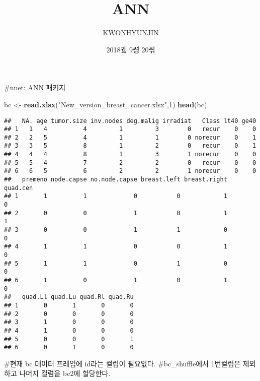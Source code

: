 \documentclass[]{article}
\title{ANN}
\author{KWONHYUNJIN}
\date{2018뀈 9썡 20씪}
\newenvironment{Shaded}{\begin{snugshade}}{\end{snugshade}}
\newcommand{\DecValTok}[1]{\textcolor[rgb]{0.00,0.00,0.81}{#1}}
\newcommand{\KeywordTok}[1]{\textcolor[rgb]{0.13,0.29,0.53}{\textbf{#1}}}
\newcommand{\NormalTok}[1]{#1}
\newcommand{\OperatorTok}[1]{\textcolor[rgb]{0.81,0.36,0.00}{\textbf{#1}}}
\newcommand{\StringTok}[1]{\textcolor[rgb]{0.31,0.60,0.02}{#1}}
\begin{document}
\maketitle

\#nnet: ANN 패키지

\begin{Shaded}
\begin{Highlighting}[]
\NormalTok{bc <-}\StringTok{ }\KeywordTok{read.xlsx}\NormalTok{(}\StringTok{"New_version_breast_cancer.xlsx"}\NormalTok{,}\DecValTok{1}\NormalTok{)}
\KeywordTok{head}\NormalTok{(bc)}
\end{Highlighting}
\end{Shaded}

\begin{verbatim}
##   NA. age tumor.size inv.nodes deg.malig irradiat   Class lt40 ge40
## 1   1   4          4         1         3        0   recur    0    0
## 2   2   5          4         1         1        0 norecur    0    1
## 3   3   5          8         1         2        0   recur    0    1
## 4   4   4          8         1         3        1 norecur    0    0
## 5   5   4          7         2         2        0   recur    0    0
## 6   6   5          6         2         2        1 norecur    0    0
##   premeno node.capse no.node.capse breast.left breast.right quad.cen
## 1       1          1             0           0            1        0
## 2       0          0             1           0            1        1
## 3       0          0             1           1            0        0
## 4       1          1             0           0            1        0
## 5       1          1             0           1            0        0
## 6       1          0             1           0            1        0
##   quad.Ll quad.Lu quad.Rl quad.Ru
## 1       0       1       0       0
## 2       0       0       0       0
## 3       1       0       0       0
## 4       1       0       0       0
## 5       0       0       0       1
## 6       0       1       0       0
\end{verbatim}

\#현재 bc 데이터 프레임에 id라는 컬럼이 필요없다. \#bc\_shuffle에서
1번컬럼은 제외하고 나머지 컬럼을 bc2에 할당한다.

\begin{Shaded}
\end{Shaded}
\end{document}
